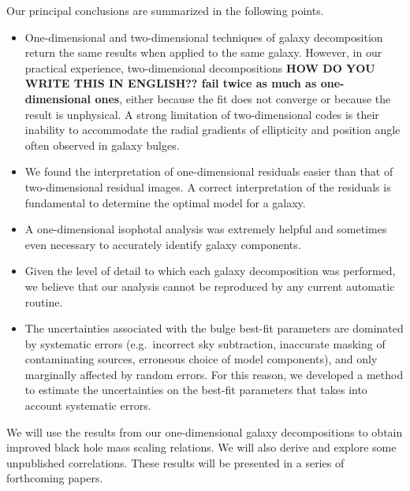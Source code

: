 \documentclass[preprint2]{emulateapj}
\begin{document}
Our principal conclusions are summarized in the following points.
\begin{itemize}
\item One-dimensional and two-dimensional techniques of galaxy decomposition return the same results when applied to the same galaxy.
However, in our practical experience, two-dimensional decompositions {\bf HOW DO YOU WRITE THIS IN ENGLISH?? fail twice as much as one-dimensional ones}, 
either because the fit does not converge or because the result is unphysical. 
A strong limitation of two-dimensional codes is their inability to accommodate the radial gradients of ellipticity and position angle 
often observed in galaxy bulges.
\item We found the interpretation of one-dimensional residuals easier than that of two-dimensional residual images. 
A correct interpretation of the residuals is fundamental to determine the optimal model for a galaxy.
\item A one-dimensional isophotal analysis was extremely helpful and sometimes even necessary to accurately identify galaxy components.
\item Given the level of detail to which each galaxy decomposition was performed, 
we believe that our analysis cannot be reproduced by any current automatic routine. 
\item The uncertainties associated with the bulge best-fit parameters are dominated by systematic errors (e.g.~incorrect sky subtraction, 
inaccurate masking of contaminating sources, erroneous choice of model components), and only marginally affected by random errors. 
For this reason, we developed a method to estimate the uncertainties on the best-fit parameters that takes into account systematic errors.
\end{itemize}

We will use the results from our one-dimensional galaxy decompositions to obtain improved black hole mass scaling relations. 
We will also derive and explore some unpublished correlations. 
These results will be presented in a series of forthcoming papers.


\end{document}
